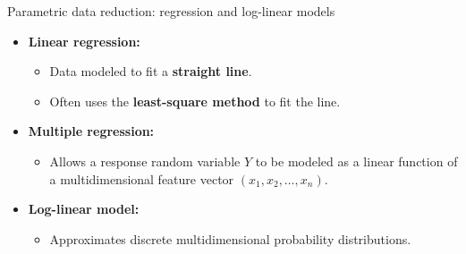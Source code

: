 \documentclass[aspectratio=169,t]{beamer}
\begin{document}
  { 
    \begin{frame}{Parametric data reduction: regression and log-linear models}
    \begin{itemize}
      \item \textbf{Linear regression:}
      \begin{itemize}
        \item Data modeled to fit a \textbf{{\color{airforceblue}straight line}}.
        \item Often uses the \textbf{{\color{airforceblue}least-square method}} to fit the line.
      \end{itemize}
      \item \textbf{Multiple regression:}
      \begin{itemize}
        \item Allows a response random variable $Y$ to be modeled as a linear function of a multidimensional feature vector $(x_1, x_2,\ldots, x_n)$.
      \end{itemize}
      \item \textbf{Log-linear model:}
      \begin{itemize}
        \item Approximates discrete multidimensional probability distributions.
      \end{itemize}
    \end{itemize}
    \end{frame}
  }
\end{document}
